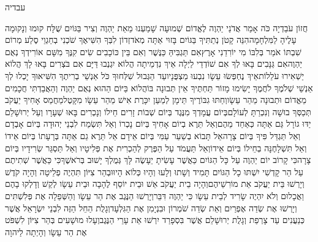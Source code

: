 \documentclass[../main/main.tex]{subfiles}
\begin{document}
\thispagestyle{empty}
\Incipit{}עבדיה
\cleardoublepage
\RTLmulticolcolumns
\begin{multicols*}{\ncols}
חֲזוֹן עֹבַדְיָה כֹּה אָמַר אֲדֹנַי יַהְוֶה לֶאֱדוֹם שְׁמוּעָה שָׁמַעְנוּ מֵאֵת יַהְוֶה וְצִיר בַּגּוֹיִם שֻׁלָּח קוּמוּ וְנָקוּמָה עָלֶיהָ לַמִּלְחָמָה\PreVerseSpace{}הִנֵּה קָטֹן נְתַתִּיךָ בַּגּוֹיִם בָּזוּי אַתָּה מְאֹד\PreVerseSpace{}זְדוֹן לִבְּךָ הִשִּׁיאֶךָ שֹׁכְנִי בְחַגְוֵי סֶלַע מְרוֹם שִׁבְתּוֹ אֹמֵר בְּלִבּוֹ מִי יוֹרִדֵנִי אָרֶץ\PreVerseSpace{}אִם תַּגְבִּיהַּ כַּנֶּשֶׁר וְאִם בֵּין כּוֹכָבִים שִׂים קִנֶּךָ מִשָּׁם אוֹרִידְךָ נְאֻם יַהְוֶה\PreVerseSpace{}אִם גַּנָּבִים בָּאוּ לְךָ אִם שׁוֹדְדֵי לַיְלָה אֵיךְ נִדְמֵיתָה הֲלוֹא יִגְנְבוּ דַּיָּם אִם בֹּצְרִים בָּאוּ לָךְ הֲלוֹא יַשְׁאִירוּ עֹלֵלוֹת\PreVerseSpace{}אֵיךְ נֶחְפְּשׂוּ עֵשָׂו נִבְעוּ מַצְפֻּנָיו\PreVerseSpace{}עַד הַגְּבוּל שִׁלְּחוּךָ כֹּל אַנְשֵׁי בְרִיתֶךָ הִשִּׁיאוּךָ יָכְלוּ לְךָ אַנְשֵׁי שְׁלֹמֶךָ לֹחֲמֶךָ\SubEnd{} יָשִׂימוּ מָזוֹר תַּחְתֶּיךָ אֵין תְּבוּנָה בּוֹ\PreVerseSpace{}הֲלוֹא בַּיּוֹם הַהוּא נְאֻם יַהְוֶה וְהַאֲבַדְתִּי חֲכָמִים מֵאֱדוֹם וּתְבוּנָה מֵהַר עֵשָׂו\PreVerseSpace{}וְחַתּוּ גִבּוֹרֶיךָ תֵּימָן לְמַעַן יִכָּרֶת אִישׁ מֵהַר עֵשָׂו מִקָּטֶל\PreVerseSpace{}מֵחֲמַס אָחִיךָ יַעֲקֹב תְּכַסְּךָ בוּשָׁה וְנִכְרַתָּ לְעוֹלָם\PreVerseSpace{}בְּיוֹם עֲמָדְךָ מִנֶּגֶד בְּיוֹם שְׁבוֹת זָרִים חֵילוֹ וְנָכְרִים בָּאוּ שְׁעָרָו וְעַל יְרוּשָׁלֵם יַדּוּ גוֹרָל גַּם אַתָּה כְּאַחַד מֵהֶם\PreVerseSpace{}וְאַל תֵּרֶא בְיוֹם אָחִיךָ בְּיוֹם נָכְרוֹ וְאַל תִּשְׂמַח לִבְנֵי יְהוּדָה בְּיוֹם אָבְדָם וְאַל תַּגְדֵּל פִּיךָ בְּיוֹם צָרָה\PreVerseSpace{}אַל תָּבוֹא בְשַׁעַר עַמִּי בְּיוֹם אֵידָם אַל תֵּרֶא גַם אַתָּה בְּרָעָתוֹ בְּיוֹם אֵידוֹ וְאַל תִּשְׁלָחֶנָּה\SubEnd{} בְחֵילוֹ בְּיוֹם אֵידוֹ\PreVerseSpace{}וְאַל תַּעֲמֹד עַל הַפֶּרֶק לְהַכְרִית אֶת פְּלִיטָיו וְאַל תַּסְגֵּר שְׂרִידָיו בְּיוֹם צָרָה\PreVerseSpace{}כִּי קָרוֹב יוֹם יַהְוֶה עַל כָּל הַגּוֹיִם כַּאֲשֶׁר עָשִׂיתָ יֵעָשֶׂה לָּךְ גְּמֻלְךָ יָשׁוּב בְּרֹאשֶׁךָ\PreVerseSpace{}כִּי כַּאֲשֶׁר שְׁתִיתֶם עַל הַר קָדְשִׁי יִשְׁתּוּ כָל הַגּוֹיִם תָּמִיד וְשָׁתוּ וְלָעוּ וְהָיוּ כְּלוֹא הָיוּ\PreVerseSpace{}וּבְהַר צִיּוֹן תִּהְיֶה פְלֵיטָה וְהָיָה קֹדֶשׁ וְיָרְשׁוּ בֵּית יַעֲקֹב אֵת מוֹרִשֵׁיהֶם\SubEnd{}\PreVerseSpace{}וְהָיָה בֵית יַעֲקֹב אֵשׁ וּבֵית יוֹסֵף לֶהָבָה וּבֵית עֵשָׂו לְקַשׁ וְדָלְקוּ בָהֶם וַאֲכָלוּם וְלֹא יִהְיֶה שָׂרִיד לְבֵית עֵשָׂו כִּי יַהְוֶה דִּבֵּר\PreVerseSpace{}וְיָרְשׁוּ הַנֶּגֶב אֶת הַר עֵשָׂו וְהַשְּׁפֵלָה אֶת פְּלִשְׁתִּים וְיָרְשׁוּ אֶת שְׂדֵה אֶפְרַיִם וְאֵת שְׂדֵה שֹׁמְרוֹן וּבִנְיָמִן אֶת הַגִּלְעָד\PreVerseSpace{}וְגָלֻת הַחֵל הַזֶּה לִבְנֵי יִשְׂרָאֵל אֲשֶׁר כְּנַעֲנִים עַד צָרְפַת וְגָלֻת יְרוּשָׁלֵם אֲשֶׁר בִּסְפָרַד יִרְשׁוּ אֵת עָרֵי הַנֶּגֶב\PreVerseSpace{}וְעָלוּ מוּשָׁעִים\SubEnd{} בְּהַר צִיּוֹן לִשְׁפֹּט אֶת הַר עֵשָׂו וְהָיְתָה לַיהוָה\par
\end{multicols*}
\end{document}
